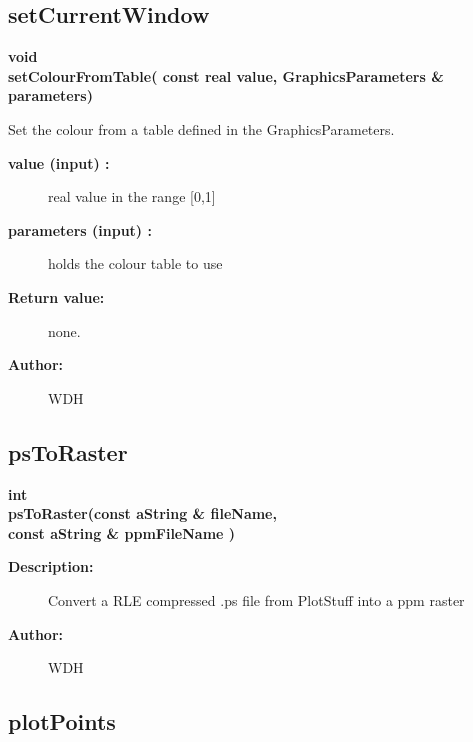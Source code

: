 \subsection{setCurrentWindow}
 
\begin{flushleft} \textbf{%
void  \\ 
\settowidth{\GLGraphicsInterfaceIncludeArgIndent}{setColourFromTable(}%
setColourFromTable( const real value, GraphicsParameters \& parameters)
}\end{flushleft}
  Set the colour from a table defined in the GraphicsParameters.
\begin{description}
\item[{\bf value (input) :}]  real value in the range [0,1]
\item[{\bf parameters (input) :}]  holds the colour table to use
\item[{\bf Return value:}]  none.

\item[{\bf Author:}]  WDH
\end{description}
\subsection{psToRaster}
 
\begin{flushleft} \textbf{%
int  \\ 
\settowidth{\GLGraphicsInterfaceIncludeArgIndent}{psToRaster(}%
psToRaster(const aString \& fileName,\\ 
\hspace{\GLGraphicsInterfaceIncludeArgIndent}const aString \& ppmFileName )
}\end{flushleft}
\begin{description}
\item[{\bf Description:}] 
 Convert a RLE compressed .ps file from PlotStuff into a ppm raster 
\item[{\bf Author:}]  WDH
\end{description}
\subsection{plotPoints}
 
